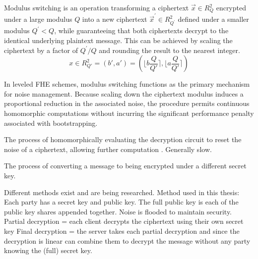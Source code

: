 \begin{definition}
    Modulus switching is an operation transforming a ciphertext $\vec{x}\in R_{Q}^{2}$ encrypted under a large modulus $Q$ into a new ciphertext $\vec{x}^{\prime}\in R_{Q^{\prime}}^{2}$ defined under a smaller modulus $Q^{\prime} < Q$, while guaranteeing that both ciphertexts decrypt to the identical underlying plaintext message. This can be achieved by scaling the ciphertext by a factor of $Q^{\prime}/Q$ and rounding the result to the nearest integer.
    \begin{equation}
        x\in R_{Q'}^{2} = (b', a') = (\lfloor b\frac{Q}{Q'} \rceil, \lfloor a\frac{Q}{Q'} \rceil)
    \end{equation}
\end{definition}

In leveled FHE schemes, modulus switching functions as the primary mechanism for noise management. Because scaling down the ciphertext modulus induces a proportional reduction in the associated noise, the procedure permits continuous homomorphic computations without incurring the significant performance penalty associated with bootstrapping.


\begin{definition}[Bootstrapping]
    The process of homomorphically evaluating the decryption circuit to reset the noise of a ciphertext, allowing further computation \cite{gentry:2009}. Generally slow.
\end{definition}

\begin{definition}[Keyswitching]
    The process of converting a message to being encrypted under a different secret key.
\end{definition}

\begin{definition}
    Different methods exist and are being researched. Method used in this thesis:
    Each party has a secret key and public key. The full public key is each of the public key shares appended together.
    Noise is flooded to maintain security.
    Partial decryption = each client decrypts the ciphertext using their own secret key
    Final decryption = the server takes each partial decryption and since the decryption is linear can combine them to decrypt the message without any party knowing the (full) secret key.
\end{definition}

